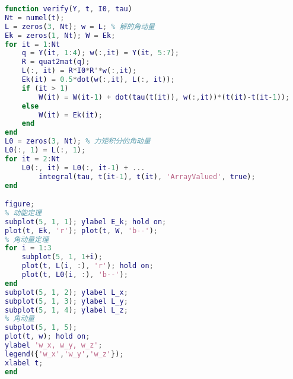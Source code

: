 \begin{lstlisting}[language=matlab, caption=rigBdRot.m]
% 验证角动量定理
function verify(Y, t, I0, tau)
Nt = numel(t);
L = zeros(3, Nt); w = L; % 解的角动量
Ek = zeros(1, Nt); W = Ek;
for it = 1:Nt
    q = Y(it, 1:4); w(:,it) = Y(it, 5:7);
    R = quat2mat(q);
    L(:, it) = R*I0*R'*w(:,it);
    Ek(it) = 0.5*dot(w(:,it), L(:, it));
    if (it > 1)
        W(it) = W(it-1) + dot(tau(t(it)), w(:,it))*(t(it)-t(it-1));
    else
        W(it) = Ek(it);
    end
end
L0 = zeros(3, Nt); % 力矩积分的角动量
L0(:, 1) = L(:, 1);
for it = 2:Nt
    L0(:, it) = L0(:, it-1) + ...
        integral(tau, t(it-1), t(it), 'ArrayValued', true);
end

figure;
% 动能定理
subplot(5, 1, 1); ylabel E_k; hold on;
plot(t, Ek, 'r'); plot(t, W, 'b--');
% 角动量定理
for i = 1:3
    subplot(5, 1, 1+i);
    plot(t, L(i, :), 'r'); hold on;
    plot(t, L0(i, :), 'b--');
end
subplot(5, 1, 2); ylabel L_x;
subplot(5, 1, 3); ylabel L_y;
subplot(5, 1, 4); ylabel L_z;
% 角动量
subplot(5, 1, 5);
plot(t, w); hold on;
ylabel 'w_x, w_y, w_z';
legend({'w_x','w_y','w_z'});
xlabel t;
end
\end{lstlisting}
